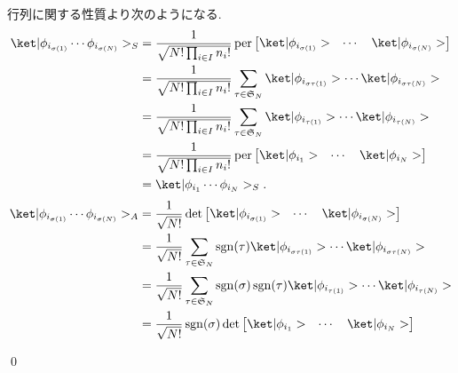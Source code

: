 \documentclass[uplatex,dvipdfmx,a4paper,11pt]{jlreq}
\makeatletter
\DeclareMathOperator{\sgn}{sgn}
\DeclareMathOperator{\per}{per}
\DeclareMathOperator{\Det}{det}
\renewcommand{\SS}{\mathfrak{S}}
\numberwithin{equation}{section}
\theoremstyle{definition}
\renewenvironment{proof}[1][\proofname]{\par
  \normalfont
  \topsep6\p@\@plus6\p@ \trivlist
  \item[\hskip\labelsep{\bfseries #1}\@addpunct{\bfseries}]\ignorespaces\quad\par
}{
  \qed\endtrivlist\@endpefalse
}
\renewcommand\proofname{証明}
\makeatother
\begin{document}
\begin{proof}
  行列に関する性質より次のようになる.
  \begin{align}
    \ket|\phi_{i_{\sigma(1)}}\cdots\phi_{i_{\sigma(N)}}>_S & = \frac{1}{\sqrt{N!\prod_{i\in I}n_i!}}\per\begin{bmatrix}\ket|\phi_{i_{\sigma(1)}}> & \cdots & \ket|\phi_{i_{\sigma(N)}}>\end{bmatrix} \\
                                                           & = \frac{1}{\sqrt{N!\prod_{i\in I}n_i!}}\sum_{\tau\in\SS_N}\ket|\phi_{i_{\sigma\tau(1)}}>\cdots\ket|\phi_{i_{\sigma\tau(N)}}>                                              \\
                                                           & = \frac{1}{\sqrt{N!\prod_{i\in I}n_i!}}\sum_{\tau\in\SS_N}\ket|\phi_{i_{\tau(1)}}>\cdots\ket|\phi_{i_{\tau(N)}}>                                                          \\
                                                           & = \frac{1}{\sqrt{N!\prod_{i\in I}n_i!}}\per\begin{bmatrix}\ket|\phi_{i_1}> & \cdots & \ket|\phi_{i_N}>\end{bmatrix}                                                       \\
                                                           & = \ket|\phi_{i_1}\cdots\phi_{i_N}>_S.
  \end{align}
  \begin{align}
    \ket|\phi_{i_{\sigma(1)}}\cdots\phi_{i_{\sigma(N)}}>_A & = \frac{1}{\sqrt{N!}}\Det\begin{bmatrix}\ket|\phi_{i_{\sigma(1)}}> & \cdots & \ket|\phi_{i_{\sigma(N)}}>\end{bmatrix} \\
                                                           & = \frac{1}{\sqrt{N!}}\sum_{\tau\in\SS_N}\sgn(\tau)\ket|\phi_{i_{\sigma\tau(1)}}>\cdots\ket|\phi_{i_{\sigma\tau(N)}}>                                    \\
                                                           & = \frac{1}{\sqrt{N!}}\sum_{\tau\in\SS_N}\sgn(\sigma)\sgn(\tau)\ket|\phi_{i_{\tau(1)}}>\cdots\ket|\phi_{i_{\tau(N)}}>                                    \\
                                                           & = \frac{1}{\sqrt{N!}}\sgn(\sigma)\Det\begin{bmatrix}\ket|\phi_{i_1}> & \cdots & \ket|\phi_{i_N}>\end{bmatrix}                                           \\

\end{align}
\end{proof}
\end{document}
